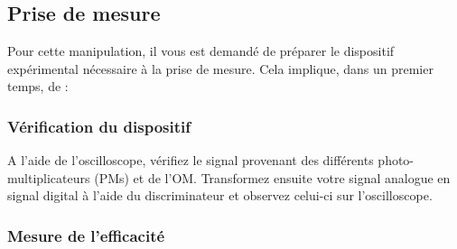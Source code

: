 

\subsection{Prise de mesure}

Pour cette manipulation, il vous est demandé de préparer le dispositif expérimental nécessaire à la prise de mesure. Cela implique, dans un premier temps, de :

\begin{center}
\end{center}

\subsubsection{Vérification du dispositif}
A l'aide de l'oscilloscope, vérifiez le signal provenant des différents photo-multiplicateurs (PMs) et de l'OM. Transformez ensuite votre signal analogue en signal digital à l'aide du discriminateur et observez celui-ci sur l'oscilloscope.

\subsubsection{Mesure de l'efficacité}

